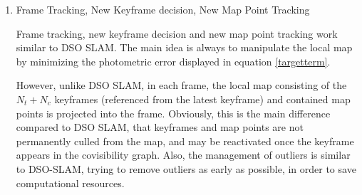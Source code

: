 \begin{enumerate}
	\item{Frame Tracking, New Keyframe decision, New Map Point Tracking}
	
	Frame tracking, new keyframe decision and new map point tracking work similar to DSO SLAM. The main idea is always to manipulate the local map 
	by minimizing the photometric error displayed in equation \ref{targetterm}. 

	However, unlike DSO SLAM, in each frame, the local map 
	consisting of the $N_t + N_c$ keyframes (referenced from the latest keyframe) and contained map points is projected into the frame. 
	Obviously, this is the main difference compared to DSO SLAM, that keyframes and map points are not permanently culled from the 
	map, and may be reactivated once the keyframe appears in the covisibility graph. Also, the management of outliers is similar to DSO-SLAM, 
	trying to remove outliers as early as possible, in order to save computational resources. 
	\end{enumerate}
 